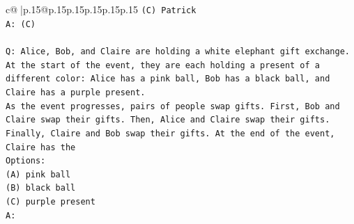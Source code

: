 \documentclass{article}
\begin{document}
{\begin{supertabular}{c@{$\;$}|p{.15\linewidth}@{}p{.15\linewidth}p{.15\linewidth}p{.15\linewidth}p{.15\linewidth}p{.15\linewidth}}
{{{\texttt{(C) Patrick} \\
\texttt{A: (C)} \\
\\ 
\texttt{Q: Alice, Bob, and Claire are holding a white elephant gift exchange. At the start of the event, they are each holding a present of a different color: Alice has a pink ball, Bob has a black ball, and Claire has a purple present.} \\
\texttt{As the event progresses, pairs of people swap gifts. First, Bob and Claire swap their gifts. Then, Alice and Claire swap their gifts. Finally, Claire and Bob swap their gifts. At the end of the event, Claire has the} \\
\texttt{Options:} \\
\texttt{(A) pink ball} \\
\texttt{(B) black ball} \\
\texttt{(C) purple present} \\
\texttt{A:} \\
            }
        }
    }
     \\ \\


\end{supertabular}}
\end{document}
